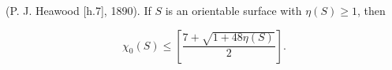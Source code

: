 (P. J. Heawood [h.7], 1890). If $S$ is an orientable surface with $\eta(S) \geq 1$, then

$$\chi_0(S) \leq \left[ \frac{7 + \sqrt{1 + 48\eta(S)}}{2} \right].$$
